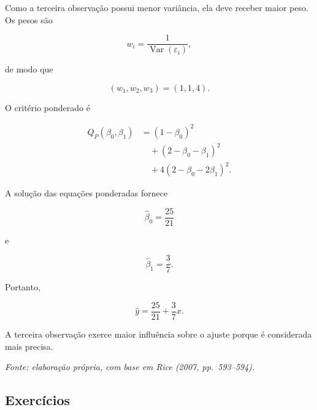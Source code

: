 \documentclass[
  letterpaper,
  DIV=11,
  numbers=noendperiod]{scrreprt}
\begin{document}
Como a terceira observação possui menor variância, ela deve receber
maior peso. Os pesos são

\[w_i
=
\frac{1}{
\operatorname{Var}(\varepsilon_i)
},\]

de modo que

\[(w_1,w_2,w_3)
=
(1,1,4).\]

O critério ponderado é

\[\begin{aligned}
Q_P(\beta_0,\beta_1)
&=
(1-\beta_0)^2\\
&\quad+
(2-\beta_0-\beta_1)^2\\
&\quad+
4(2-\beta_0-2\beta_1)^2.
\end{aligned}\]

A solução das equações ponderadas fornece

\[\widehat\beta_0
=
\frac{25}{21}\]

e

\[\widehat\beta_1
=
\frac{3}{7}.\]

Portanto,

\[\widehat y
=
\frac{25}{21}
+
\frac{3}{7}x.\]

A terceira observação exerce maior influência sobre o ajuste porque é
considerada mais precisa.

\emph{Fonte: elaboração própria, com base em Rice (2007, pp.~593--594).}

\subsection{Exercícios}\label{exercuxedcios-4}
\end{document}
